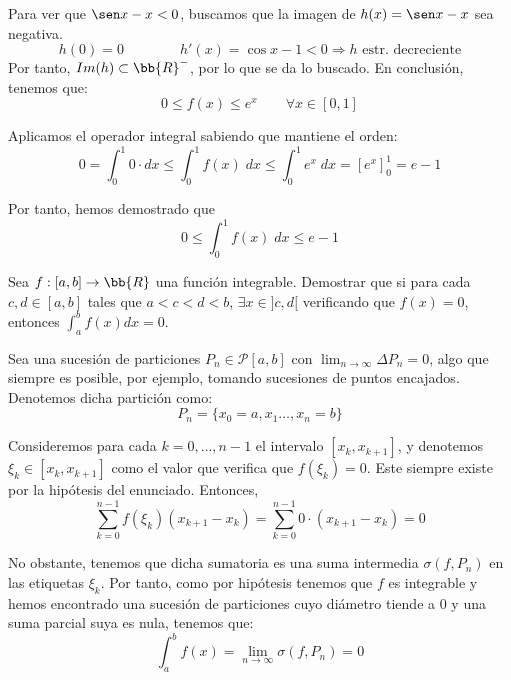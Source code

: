 \begin{ejercicio}
    Para ver que $\sen x - x < 0$, buscamos que la imagen de $h(x)=\sen x -x$ sea negativa.
    \begin{equation*}
        h(0)=0 \qquad\qquad h'(x)=\cos x -1 < 0 \Longrightarrow h\text{ estr. decreciente}
    \end{equation*}
    Por tanto, $Im(h)\subset \bb{R}^-$, por lo que se da lo buscado. En conclusión, tenemos que:
    \begin{equation*}
        0\leq f(x) \leq e^x \qquad \forall x\in [0,1]
    \end{equation*}

    Aplicamos el operador integral sabiendo que mantiene el orden:
    \begin{equation*}
        0 = \int_0^1 0\cdot dx \leq \int_0^1 f(x)\;dx \leq \int_0^1e^x\;dx = \left[e^x\right]_0^1 = e-1
    \end{equation*}

    Por tanto, hemos demostrado que 
    \begin{equation*}
        0 \leq \int_0^1 f(x)\;dx \leq e-1
    \end{equation*}
\end{ejercicio}

\begin{ejercicio}
    Sea $f:[a,b]\to \bb{R}$ una función integrable. Demostrar que si para cada $c,d\in [a,b]$ tales que $a<c<d<b$, $\exists x\in ]c,d[$ verificando que $f(x)=0$, entonces $\int_a^b f(x)dx = 0$.

    Sea una sucesión de particiones $P_n\in \mathscr{P}[a,b]$ con $\displaystyle \lim_{n\to \infty}\Delta P_n = 0$, algo que siempre es posible, por ejemplo, tomando sucesiones de puntos encajados. Denotemos dicha partición como:
    \begin{equation*}
        P_n = \{x_0=a,x_1\dots, x_n=b\}
    \end{equation*}

    Consideremos para cada $k=0,\dots,n-1$ el intervalo $[x_k, x_{k+1}]$, y denotemos $\xi_k\in [x_k, x_{k+1}]$ como el valor que verifica que $f(\xi_k)=0$. Este siempre existe por la hipótesis del enunciado. Entonces,
    \begin{equation*}
        \sum_{k=0}^{n-1}f(\xi_k)(x_{k+1}-x_k) = \sum_{k=0}^{n-1}0\cdot (x_{k+1}-x_k) = 0
    \end{equation*}

    No obstante, tenemos que dicha sumatoria es una suma intermedia $\sigma(f,P_n)$ en las etiquetas $\xi_k$. Por tanto, como por hipótesis tenemos que $f$ es integrable y hemos encontrado una sucesión de particiones cuyo diámetro tiende a $0$ y una suma parcial suya es nula, tenemos que:
    \begin{equation*}
        \int_a^b f(x) = \lim_{n\to \infty} \sigma(f, P_n) = 0
    \end{equation*}
\end{ejercicio}

